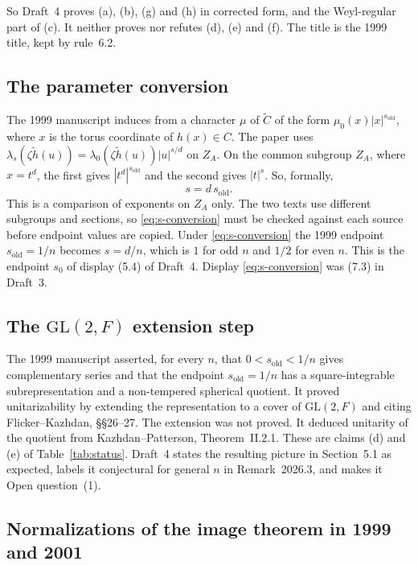 \documentclass[12pt,letterpaper]{article}
\newcommand{\Ct}{\widetilde C}
\newcommand{\hl}{\tilde h}
\newcommand{\ZA}{Z_A}
\newcommand{\GL}{\mathrm{GL}}
\begin{document}
So Draft~4 proves (a), (b), (g) and (h) in corrected form, and the
Weyl-regular part of (c). It neither proves nor refutes (d), (e) and
(f). The title is the 1999 title, kept by rule~6.2.

\subsection{The parameter conversion}\label{subsec:conv-moved}

The 1999 manuscript induces from a character $\mu$ of $\Ct$ of the form
$\mu_0(x)|x|^{s_{\mathrm{old}}}$, where $x$ is the torus coordinate of
$h(x)\in C$. The paper uses
$\lambda_s(\zeta\hl(u))=\lambda_0(\zeta\hl(u))|u|^{s/d}$ on $\ZA$. On
the common subgroup $\ZA$, where $x=t^d$, the first gives
$|t^d|^{s_{\mathrm{old}}}$ and the second gives $|t|^{s}$. So, formally,
\begin{equation}\label{eq:s-conversion}
s=d\,s_{\mathrm{old}} .
\end{equation}
This is a comparison of exponents on $\ZA$ only. The two texts use
different subgroups and sections, so \eqref{eq:s-conversion} must be
checked against each source before endpoint values are copied. Under
\eqref{eq:s-conversion} the 1999 endpoint $s_{\mathrm{old}}=1/n$ becomes
$s=d/n$, which is $1$ for odd $n$ and $1/2$ for even $n$. This is the
endpoint $s_0$ of display (5.4) of Draft~4. Display \eqref{eq:s-conversion}
was (7.3) in Draft~3.

\subsection{The $\GL(2,F)$ extension step}\label{subsec:gl2-moved}

The 1999 manuscript asserted, for every $n$, that
$0<s_{\mathrm{old}}<1/n$ gives complementary series and that the
endpoint $s_{\mathrm{old}}=1/n$ has a square-integrable
subrepresentation and a non-tempered spherical quotient. It proved
unitarizability by extending the representation to a cover of
$\GL(2,F)$ and citing Flicker--Kazhdan, \S\S26--27. The extension was
not proved. It deduced unitarity of the quotient from
Kazhdan--Patterson, Theorem~II.2.1. These are claims (d) and (e) of
Table~\ref{tab:status}. Draft~4 states the resulting picture in
Section~5.1 as expected, labels it conjectural for general $n$ in
Remark~2026.3, and makes it Open question~(1).

\subsection{Normalizations of the image theorem in 1999 and 2001}
\label{subsec:norm-moved}
\end{document}
